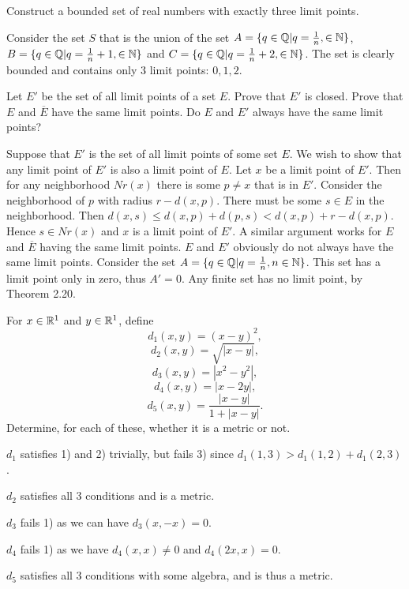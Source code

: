 \begin{problem}
  Construct a bounded set of real numbers with exactly three limit points.
\end{problem}

\begin{solution}
  Consider the set $S$ that is the union of the set $A = \{q \in \mathbb{Q} | q = \frac{1}{n}, \in \mathbb{N}\}$, $B = \{q \in \mathbb{Q} | q = \frac{1}{n} + 1, \in \mathbb{N}\}$ and $C = \{q \in \mathbb{Q} | q = \frac{1}{n} + 2, \in \mathbb{N}\}$.
  The set is clearly bounded and contains only 3 limit points: $0, 1, 2$.
\end{solution}

\begin{problem}
  Let $E'$ be the set of all limit points of a set $E$.
  Prove that $E'$ is closed.
  Prove that $E$ and $\overline{E}$ have the same limit points.
  Do $E$ and $E'$ always have the same limit points?
\end{problem}

\begin{solution}
  Suppose that $E'$ is the set of all limit points of some set $E$.
  We wish to show that any limit point of $E'$ is also a limit point of $E$.
  Let $x$ be a limit point of $E'$.
  Then for any neighborhood $Nr(x)$ there is some $p \neq x$ that is in $E'$.
  Consider the neighborhood of $p$ with radius $r - d(x, p)$.
  There must be some $s \in E$ in the neighborhood.
  Then $d(x, s) \le d(x, p) + d(p, s) < d(x, p) + r - d(x, p)$.
  Hence $s \in Nr(x)$ and $x$ is a limit point of $E'$.
  A similar argument works for $E$ and $\overline{E}$ having the same limit points.
  $E$ and $E'$ obviously do not always have the same limit points.
  Consider the set $A = \{q \in \mathbb{Q} | q = \frac{1}{n}, n \in \mathbb{N}\}$.
  This set has a limit point only in zero, thus $A' = {0}$.
  Any finite set has no limit point, by Theorem 2.20.
\end{solution}

\setcounter{problem}{10}
\begin{problem}
  For $x \in \mathbb{R}^1$ and $y \in \mathbb{R}^1$, define
  \[d_1(x, y) = (x - y)^2,\]
  \[d_2(x, y) = \sqrt{|x - y|},\]
  \[d_3(x, y) = |x^2 - y^2|,\]
  \[d_4(x, y) = |x - 2y|,\]
  \[d_5(x, y) = \frac{|x - y|}{1 + |x - y|}.\]
  Determine, for each of these, whether it is a metric or not.
\end{problem}

\begin{solution}
  $d_1$ satisfies 1) and 2) trivially, but fails 3) since $d_1(1, 3) > d_1(1, 2) + d_1(2, 3)$.
  
  $d_2$ satisfies all 3 conditions and is a metric.

  $d_3$ fails 1) as we can have $d_3(x, -x) = 0$.

  $d_4$ fails 1) as we have $d_4(x, x) \neq 0$ and $d_4(2x, x) = 0$.

  $d_5$ satisfies all 3 conditions with some algebra, and is thus a metric.
\end{solution}

